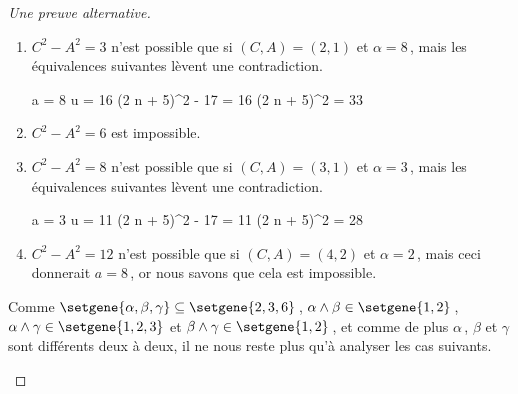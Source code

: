 \begin{proof}[Une preuve alternative]
\begin{itemize}
\begin{enumerate}
			\item $C^2 - A^2 = 3$ n'est possible que si $(C, A) = (2, 1)$ et $\alpha = 8$\,, mais les équivalences suivantes lèvent une contradiction.

    		\smallskip
    		\noindent\!\!%
       		\begin{stepcalc}[style = sar, ope = \iff]
    			a = 8
    		\explnext{}
    			u = 16
    		\explnext{}
    			(2 n + 5)^2 - 17 = 16
    		\explnext*{$33 \notin \NNsquare$}{}
    			(2 n + 5)^2 = 33
    		\end{stepcalc}	
			\smallskip
	
			\item $C^2 - A^2 = 6$ est impossible.
			
			\item $C^2 - A^2 = 8$ n'est possible que si $(C, A) = (3, 1)$ et $\alpha = 3$\,, mais les équivalences suivantes lèvent une contradiction.

    		\smallskip
    		\noindent\!\!%
       		\begin{stepcalc}[style = sar, ope = \iff]
    			a = 3
    		\explnext{}
    			u = 11
    		\explnext{}
    			(2 n + 5)^2 - 17 = 11
    		\explnext*{$28 \notin \NNsquare$}{}
    			(2 n + 5)^2 = 28
    		\end{stepcalc}	
			\smallskip
			
			
			\item $C^2 - A^2 = 12$ n'est possible que si $(C, A) = (4, 2)$ et $\alpha = 2$\,, mais ceci donnerait $a = 8$\,, or nous savons que cela est impossible.
		\end{enumerate}
	\end{itemize}


	Comme
	$\setgene{\alpha, \beta, \gamma} \subseteq \setgene{2, 3, 6}$\,,
	$\alpha \wedge \beta \in \setgene{1, 2}$\,,
	$\alpha \wedge \gamma \in \setgene{1, 2, 3}$ et
	$\beta \wedge \gamma \in \setgene{1, 2}$\,,
	et comme de plus $\alpha$\,, $\beta$ et $\gamma$ sont différents deux à deux, il ne nous reste plus qu'à analyser les cas suivants.

	\begin{center}
	\end{center}



\end{proof}
